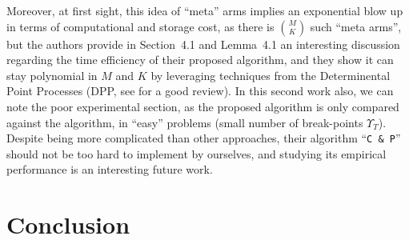 \indent
Moreover, at first sight, this idea of ``meta'' arms implies an exponential blow up in terms of computational and storage cost, as there is ${M \choose K}$ such ``meta arms'', but
the authors provide in Section~4.1 and Lemma~4.1 an interesting discussion regarding the time efficiency of their proposed algorithm, and they show it can stay polynomial in $M$ and $K$ by leveraging techniques from the Determinental Point Processes (DPP, see \cite{GaBaVa18} for a good review).
%
In this second work also, we can note the poor experimental section, as the proposed algorithm is only compared against the \MusicalChair{} algorithm, in ``easy'' problems (small number of break-points $\Upsilon_T$).
Despite being more complicated than other approaches, their algorithm ``\texttt{C \& P}'' should not be too hard to implement by ourselves, and studying its empirical performance is an interesting future work.






\newpage  %
\section{Conclusion}
\label{sec:5:conclusion}

